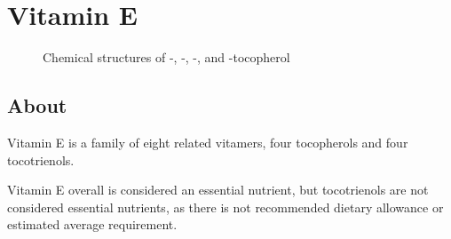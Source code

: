 \documentclass{book}
\begin{document}
\begin{sloppypar}
\chapter{Vitamin E}
\begin{figure}[h]
	\caption{Chemical structures of \textalpha -, \textbeta -, \textgamma -, and \textdelta -tocopherol}
\end{figure}
\newpage

\section{About}
Vitamin E is a family of eight related vitamers, four tocopherols and four tocotrienols.

Vitamin E overall is considered an essential nutrient, but tocotrienols are not considered essential nutrients, as there is not recommended dietary allowance or estimated average requirement.


\end{sloppypar}
\end{document}
